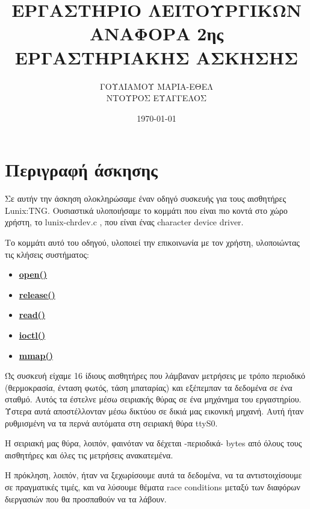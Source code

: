 \documentclass[a4paper]{article}
\title{ΕΡΓΑΣΤΗΡΙΟ ΛΕΙΤΟΥΡΓΙΚΩΝ\\ΑΝΑΦΟΡΑ 2ης ΕΡΓΑΣΤΗΡΙΑΚΗΣ ΑΣΚΗΣΗΣ}
\author{ ΓΟΥΛΙΑΜΟΥ ΜΑΡΙΑ-ΕΘΕΛ\\ ΝΤΟΥΡΟΣ ΕΥΑΓΓΕΛΟΣ}
\date{\today}
\newcommand{\eng}{\selectlanguage{english}}
\newcommand{\gr}{\selectlanguage{greek}}
\begin{document}
\maketitle
\section{Περιγραφή άσκησης}
Σε αυτήν την άσκηση ολοκληρώσαμε έναν οδηγό συσκευής για τους αισθητήρες Lunix:TNG. Ουσιαστικά υλοποιήσαμε το κομμάτι που είναι πιο κοντά στο χώρο χρήστη, το  lunix-chrdev.c , που είναι ένας character device driver.

Το κομμάτι αυτό του οδηγού, υλοποιεί την επικοινωνία με τον χρήστη, υλοποιώντας τις κλήσεις συστήματος:
\begin{itemize}
    \item \textbf{\hyperref[sec:open]{open()}}
    \item \textbf{\hyperref[sec:release]{release()}}
    \item \textbf{\hyperref[sec:read]{read()}}
    \item \textbf{\hyperref[sec:ioctl]{ioctl()}}
    \item \textbf{\hyperref[sec:mmap]{mmap()}}
\end{itemize}

Ώς συσκευή είχαμε 16 ίδιους αισθητήρες που λάμβαναν μετρήσεις με τρόπο περιοδικό (θερμοκρασία, ένταση φωτός, τάση μπαταρίας) και εξέπεμπαν τα δεδομένα σε ένα σταθμό. Αυτός τα έστελνε μέσω σειριακής θύρας σε ένα μηχάνημα του εργαστηρίου. Ύστερα αυτά αποστέλλονταν μέσω δικτύου σε δικιά μας εικονική μηχανή. Αυτή ήταν ρυθμισμένη να τα περνά αυτόματα στη σειριακή θύρα ttyS0. 

Η σειριακή μας θύρα, λοιπόν, φαινόταν να δέχεται -περιοδικά- bytes από όλους τους αισθητήρες και όλες τις μετρήσεις ανακατεμένα. 

Η πρόκληση, λοιπόν, ήταν να ξεχωρίσουμε αυτά τα δεδομένα, να τα αντιστοιχίσουμε σε πραγματικές τιμές, και να λύσουμε θέματα \eng race conditions \gr μεταξύ των διαφόρων διεργασιών που θα προσπαθούν να τα λάβουν.
\end{document}
